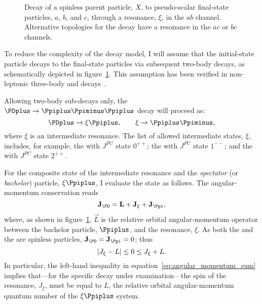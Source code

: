     \begin{figure}
        \centering
        
        \caption[Decay of a spinless parent particle to pseudo-scalar final-state particles through a resonance.]%
                {Decay of a spinless parent particle, $X$, to pseudo-scalar final-state particles, $a$, $b$, and $c$, through a resonance, $\xi$, in the $ab$ channel.
                 Alternative topologies for the decay have a resonance in the $ac$ or $bc$ channels.}
        \label{fig:isobar_three_body_decay}
    \end{figure}
    To reduce the complexity of the decay model, I will assume that the initial-state particle decays to the final-state particles via subsequent two-body decays, as schematically depicted in figure~\ref{fig:isobar_three_body_decay}.
    This assumption has been verified in non-leptonic three-body \PD{} and \PB{} decays~\cite[\S~13.2]{Bevan:2014iga}.


    Allowing two-body sub-decays only, the $\PDplus \to \Ppiplus\Ppiminus\Ppiplus$ decay will proceed as:
    \begin{equation}
        \PDplus\to\xi\Ppiplus,\qquad
        \xi\to\Ppiplus\Ppiminus,
    \end{equation}
    where $\xi$ is an intermediate resonance.
    The list of allowed intermediate states, $\xi$, includes, for example, the \Pfnez{} with $J^{PC}$ state $0^{++}$; %
    the \Prhozero{} with $J^{PC}$ state $1^{--}$; %
    and the \Pfii{} with $J^{PC}$ state $2^{++}$. %


    For the composite state of the intermediate resonance and the \emph{spectator} (or \emph{bachelor}) particle, $\xi\Ppiplus$, I evaluate the state as follows. 
    The angular-momentum conservation reads
    \begin{equation}
        \vec{J}_{\PD} = \vec{L} + \vec{J}_{\xi} + \vec{J}_{\Ppi},
    \end{equation}
    where, as shown in figure~\ref{fig:isobar_three_body_decay}, $\vec{L}$ is the relative orbital angular-momentum operator between the bachelor particle, $\Ppiplus$, and the resonance, $\xi$. %
    As both the \Ppiplus{} and the \PDplus are spinless particles, $\vec{J}_{\PD} = \vec{J}_{\Ppi} = 0$; thus
    \begin{equation}\label{eq:angular_momentum_sum}
        \lvert J_{\xi} - L\rvert \le 0 \le J_{\xi} + L.
    \end{equation}
    In particular, the left-hand inequality in equation~\eqref{eq:angular_momentum_sum} implies that---for the specific decay under examination---the spin of the resonance, $J_\xi$, must be equal to $L$, the relative orbital angular-momentum quantum number of the $\xi\Ppiplus$ system.



